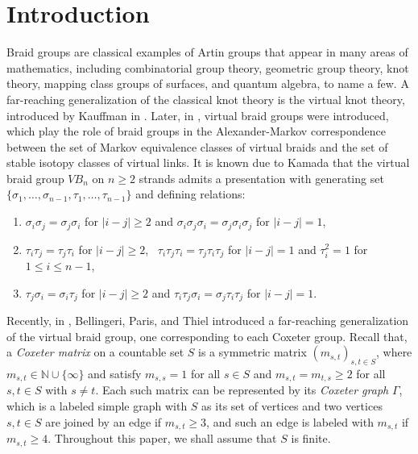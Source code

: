 \documentclass[12pt]{amsart}
\numberwithin{equation}{section}
\begin{document}
\section{Introduction}
Braid groups are classical examples of Artin groups that appear in  many areas of mathematics, including combinatorial group theory, geometric group theory, knot theory, mapping class groups of surfaces, and quantum algebra, to name a few. A far-reaching generalization of the classical knot theory is the virtual knot theory, introduced by Kauffman in \cite{MR1721925}. Later, in \cite{MR2128049}, virtual braid groups were introduced, which play the role of braid groups in the Alexander-Markov correspondence between the set of Markov equivalence classes of virtual braids and the set of stable isotopy classes of virtual links. It is known due to Kamada \cite{MR2351010} that the virtual braid group $VB_n$ on $n \ge 2$ strands admits a presentation with generating set $\{\sigma_1,\dots,\sigma_{n-1},\tau_1,\dots,\tau_{n-1} \}$ and defining relations:

\begin{enumerate}
\item $\sigma_i\sigma_j=\sigma_j\sigma_i$ for $|i-j|\ge2$ and $\sigma_i\sigma_j\sigma_i=\sigma_j\sigma_i\sigma_j$ for $|i-j|=1$,
\item $\tau_i\tau_j=\tau_j\tau_i$ for $|i-j|\ge2$, \ $\tau_i\tau_j\tau_i=\tau_j\tau_i\tau_j$ for $|i-j|=1$ and $\tau_i^2=1$ for $1\le i\le n-1$,
\item $\tau_j\sigma_i=\sigma_i\tau_j$ for $|i-j|\ge2$  and $\tau_i\tau_j\sigma_i=\sigma_j\tau_i\tau_j$ for $|i-j|=1$.
\end{enumerate}

Recently, in \cite{MR4753773}, Bellingeri, Paris, and Thiel introduced a far-reaching generalization of the virtual braid group, one corresponding to each Coxeter group. Recall that, a {\it Coxeter matrix} on a countable set $S$ is a symmetric  matrix $(m_{s,t})_{s,t\in S}$, where $m_{s,t} \in \mathbb{N} \cup\{\infty\}$ and satisfy $m_{s,s}=1$ for all $s\in S$ and $m_{s,t}=m_{t,s}\ge2$ for all $s,t\in S$ with $s\neq t$. Each such matrix can be represented by its {\it Coxeter graph} $\Gamma$, which is a labeled simple graph with $S$ as its set of vertices and two vertices $s,t \in S$ are joined by an edge if $m_{s,t}\ge3$, and such an edge is labeled with $m_{s,t}$ if $m_{s,t}\ge 4$. Throughout this paper, we shall assume that  $S$ is finite.
\par
\end{document}
